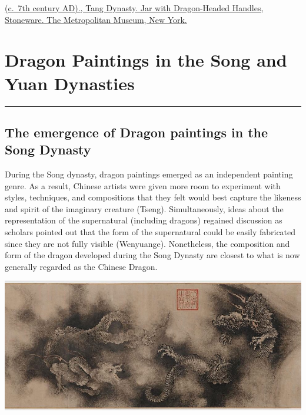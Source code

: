 \documentclass[
]{book}
\begin{document}
\href{https://www.metmuseum.org/art/collection/search/45862}{(c.~7th century AD)., Tang Dynasty. Jar with Dragon-Headed Handles, Stoneware. The Metropolitan Museum, New York.}

\hypertarget{Dragon_Paintings}{%
\chapter*{Dragon Paintings in the Song and Yuan Dynasties}\label{Dragon_Paintings}}

\begin{center}\rule{0.5\linewidth}{0.5pt}\end{center}

\hypertarget{the-emergence-of-dragon-paintings-in-the-song-dynasty}{%
\section*{The emergence of Dragon paintings in the Song Dynasty}\label{the-emergence-of-dragon-paintings-in-the-song-dynasty}}

During the Song dynasty, dragon paintings emerged as an independent painting genre. As a result, Chinese artists were given more room to experiment with styles, techniques, and compositions that they felt would best capture the likeness and spirit of the imaginary creature (Tseng). Simultaneously, ideas about the representation of the supernatural (including dragons) regained discussion as scholars pointed out that the form of the supernatural could be easily fabricated since they are not fully visible (Wenyuange). Nonetheless, the composition and form of the dragon developed during the Song Dynasty are closest to what is now generally regarded as the Chinese Dragon.

\includegraphics[width=1.2\textwidth,height=\textheight]{images/Nine_Dragons.jpg}
\end{document}
